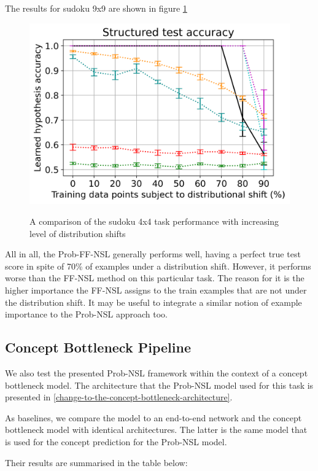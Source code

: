 The results for sudoku 9x9 are shown in figure \ref{sudoku9x9-results}
\begin{figure}[h]
\caption{A comparison of the sudoku 4x4 task performance with increasing level of distribution shifts}
\centering
\includegraphics[width=\textwidth]{logic-based-classification/sudoku_4x4_structured_test_data_results.png}
\label{sudoku9x9-results}
\end{figure}


All in all, the Prob-FF-NSL generally performs well, having a perfect true test score in spite of 70\% of examples under a distribution shift.
However, it performs worse than the FF-NSL method on this particular task. 
The reason for it is the higher importance the FF-NSL assigns to the train examples that are not under the distribution shift.
It may be useful to integrate a similar notion of example importance to the Prob-NSL approach too.


\subsection{Concept Bottleneck Pipeline}

We also test the presented Prob-NSL framework within the context of a concept bottleneck model.
The architecture that the Prob-NSL model used for this task is presented in \ref{change-to-the-concept-bottleneck-architecture}.

As baselines, we compare the model to an end-to-end network and the concept bottleneck model with identical architectures.
The latter is the same model that is used for the concept prediction for the Prob-NSL model.

Their results are summarised in the table below:

